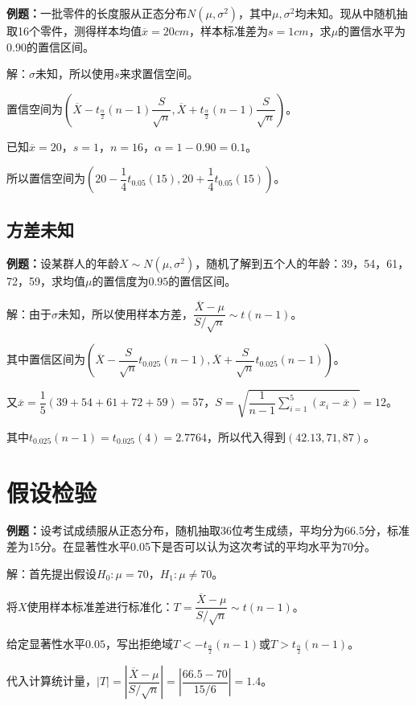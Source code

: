 \documentclass[UTF8, 12pt]{ctexart}
\begin{document}
\textbf{例题：}一批零件的长度服从正态分布$N(\mu,\sigma^2)$，其中$\mu,\sigma^2$均未知。现从中随机抽取16个零件，测得样本均值$\overline{x}=20cm$，样本标准差为$s=1cm$，求$\mu$的置信水平为0.90的置信区间。

解：$\sigma$未知，所以使用$s$来求置信空间。

置信空间为$(\overline{X}-t_\frac{\alpha}{2}(n-1)\dfrac{S}{\sqrt{n}},\overline{X}+t_\frac{\alpha}{2}(n-1)\dfrac{S}{\sqrt{n}})$。

已知$\overline{x}=20$，$s=1$，$n=16$，$\alpha=1-0.90=0.1$。

所以置信空间为$\left(20-\dfrac{1}{4}t_{0.05}(15),20+\dfrac{1}{4}t_{0.05}(15)\right)$。

\subsection{方差未知}

\textbf{例题：}设某群人的年龄$X\sim N(\mu,\sigma^2)$，随机了解到五个人的年龄：39，54，61，72，59，求均值$\mu$的置信度为$0.95$的置信区间。

解：由于$\sigma$未知，所以使用样本方差，$\dfrac{\overline{X}-\mu}{S/\sqrt{n}}\sim t(n-1)$。

其中置信区间为$\left(\overline{X}-\dfrac{S}{\sqrt{n}}t_{0.025}(n-1),\overline{X}+\dfrac{S}{\sqrt{n}}t_{0.025}(n-1)\right)$。

又$\overline{x}=\dfrac{1}{5}(39+54+61+72+59)=57$，$S=\sqrt{\dfrac{1}{n-1}\sum\limits_{i=1}^5(x_i-\overline{x})}=12$。

其中$t_{0.025}(n-1)=t_{0.025}(4)=2.7764$，所以代入得到$(42.13,71,87)$。

\section{假设检验}

\textbf{例题：}设考试成绩服从正态分布，随机抽取36位考生成绩，平均分为66.5分，标准差为15分。在显著性水平0.05下是否可以认为这次考试的平均水平为70分。

解：首先提出假设$H_0:\mu=70$，$H_1:\mu\neq70$。

将$X$使用样本标准差进行标准化：$T=\dfrac{\overline{X}-\mu}{S/\sqrt{n}}\sim t(n-1)$。

给定显著性水平$0.05$，写出拒绝域$T<-t_{\frac{\alpha}{2}}(n-1)$或$T>t_{\frac{\alpha}{2}}(n-1)$。

代入计算统计量，$\vert T\vert=\left\vert\dfrac{\overline{X}-\mu}{S/\sqrt{n}}\right\vert=\left\vert\dfrac{66.5-70}{15/6}\right\vert=1.4$。
\end{document}

